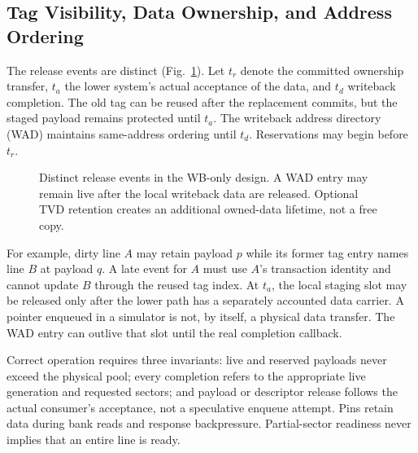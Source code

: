 \documentclass[conference,letterpaper]{IEEEtran}
\begin{document}
\subsection{Tag Visibility, Data Ownership, and Address Ordering}
The release events are distinct (Fig.~\ref{fig:lifetimes}). Let $t_r$ denote the committed ownership transfer, $t_a$ the lower system's actual acceptance of the data, and $t_d$ writeback completion. The old tag can be reused after the replacement commits, but the staged payload remains protected until $t_a$. The writeback address directory (WAD) maintains same-address ordering until $t_d$. Reservations may begin before $t_r$.

\begin{figure}[t]
\centering
{}
\caption{Distinct release events in the WB-only design. A WAD entry may remain live after the local writeback data are released. Optional TVD retention creates an additional owned-data lifetime, not a free copy.}
\label{fig:lifetimes}
\end{figure}

For example, dirty line $A$ may retain payload $p$ while its former tag entry names line $B$ at payload $q$. A late event for $A$ must use $A$'s transaction identity and cannot update $B$ through the reused tag index. At $t_a$, the local staging slot may be released only after the lower path has a separately accounted data carrier. A pointer enqueued in a simulator is not, by itself, a physical data transfer. The WAD entry can outlive that slot until the real completion callback.

Correct operation requires three invariants: live and reserved payloads never exceed the physical pool; every completion refers to the appropriate live generation and requested sectors; and payload or descriptor release follows the actual consumer's acceptance, not a speculative enqueue attempt. Pins retain data during bank reads and response backpressure. Partial-sector readiness never implies that an entire line is ready.
\end{document}
